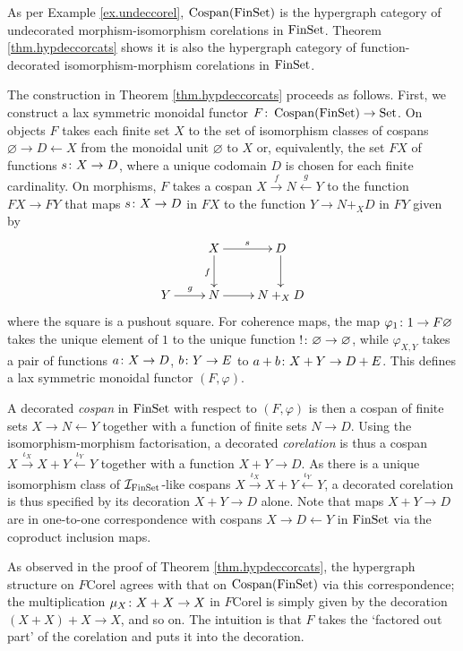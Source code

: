 \begin{example}
  As per Example \ref{ex.undeccorel}, $\operatorname{{Cospan}}(\mathrm{FinSet})$ is the hypergraph
  category of undecorated morphism-isomorphism corelations in $\mathrm{FinSet}$.
  Theorem \ref{thm.hypdeccorcats} shows it is also the hypergraph category of
  function-decorated isomorphism-morphism corelations in $\mathrm{FinSet}$.   
  
  The construction in Theorem \ref{thm.hypdeccorcats} proceeds as follows.
  First, we construct a lax symmetric monoidal functor $F{\colon} \operatorname{{Cospan}}(\mathrm{FinSet})
  \to \mathrm{Set}$. On objects $F$ takes each finite set $X$ to the set of isomorphism
  classes of cospans $\varnothing \to D \leftarrow X$ from the monoidal unit
  $\varnothing$ to $X$ or, equivalently, the set $FX$ of functions $s{\colon} X \to
  D$, where a unique codomain $D$ is chosen for each finite cardinality. On
  morphisms, $F$ takes a cospan $X \stackrel{f}\to N \stackrel{g}\leftarrow Y$
  to the function $FX \to FY$ that maps $s{\colon} X \to D$ in $FX$ to the function
  $Y \to N+_XD$ in $FY$ given by
  \[
    \xymatrix{
      & X \ar[r]^s \ar[d]_f & D \ar[d] \\
      Y \ar[r]^g  & N \ar[r] & N+_XD
    }
  \]
  where the square is a pushout square. For coherence maps, the map
  $\varphi_1{\colon} 1 \to F\varnothing$ takes the unique element of $1$ to the
  unique function $!{\colon} \varnothing \to \varnothing$, while $\varphi_{X,Y}$
  takes a pair of functions $a{\colon} X \to D$, $b{\colon} Y \to E$ to $a+b{\colon} X+Y
  \to D+E$. This defines a lax symmetric monoidal functor $(F,\varphi)$.

  A decorated \emph{cospan} in $\mathrm{FinSet}$ with respect to $(F,\varphi)$ is then a
  cospan of finite sets $X \to N \leftarrow Y$ together with a function of
  finite sets $N \to D$. Using the isomorphism-morphism factorisation, a
  decorated \emph{corelation} is thus a cospan $X \xrightarrow{\iota_X} X+Y
  \xleftarrow{\iota_Y} Y$ together with a function $X+Y \to D$. As there is a
  unique isomorphism class of $\mathcal I_{\mathrm{FinSet}}$-like cospans $X
  \xrightarrow{\iota_X} X+Y \xleftarrow{\iota_Y} Y$, a decorated corelation is
  thus specified by its decoration $X+Y \to D$ alone. Note that
  maps $X+Y \to D$ are in one-to-one correspondence with cospans $X \to D
  \leftarrow Y$ in $\mathrm{FinSet}$ via the coproduct inclusion maps.

  As observed in the proof of Theorem \ref{thm.hypdeccorcats}, the hypergraph
  structure on $F\mathrm{Corel}$ agrees with that on $\operatorname{{Cospan}}(\mathrm{FinSet})$ via
  this correspondence; the multiplication \linebreak $\mu_X{\colon} X+X \to X$ in
  $F\mathrm{Corel}$ is simply given by the decoration $(X+X)+X \to X$, and so
  on. The intuition is that $F$ takes the `factored out part' of the corelation
  and puts it into the decoration. 


\end{example}
